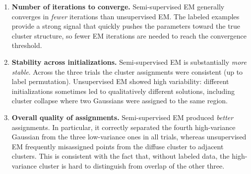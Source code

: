 \begin{answer}
\begin{enumerate}[label=\roman*.]
\item \textbf{Number of iterations to converge.}
Semi-supervised EM generally converges in \emph{fewer} iterations than unsupervised EM. The labeled examples provide a strong signal that quickly pushes the parameters toward the true cluster structure, so fewer EM iterations are needed to reach the convergence threshold.

\item \textbf{Stability across initializations.}
Semi-supervised EM is substantially \emph{more stable}. Across the three trials the cluster assignments were consistent (up to label permutation). Unsupervised EM showed high variability: different initializations sometimes led to qualitatively different solutions, including cluster collapse where two Gaussians were assigned to the same region.

\item \textbf{Overall quality of assignments.}
Semi-supervised EM produced \emph{better} assignments. In particular, it correctly separated the fourth high-variance Gaussian from the three low-variance ones in all trials, whereas unsupervised EM frequently misassigned points from the diffuse cluster to adjacent clusters. This is consistent with the fact that, without labeled data, the high-variance cluster is hard to distinguish from overlap of the other three.
\end{enumerate}
\end{answer}

